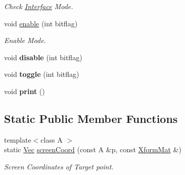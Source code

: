 \begin{DoxyCompactItemize}
\begin{DoxyCompactList}\small\item\em Check \hyperlink{classvsr_1_1_interface}{Interface} Mode. \end{DoxyCompactList}\item 
\hypertarget{classvsr_1_1_interface_a73d0fa0608b54b649203fd647e4398cd}{void \hyperlink{classvsr_1_1_interface_a73d0fa0608b54b649203fd647e4398cd}{enable} (int bitflag)}\label{classvsr_1_1_interface_a73d0fa0608b54b649203fd647e4398cd}

\begin{DoxyCompactList}\small\item\em Enable Mode. \end{DoxyCompactList}\item 
\hypertarget{classvsr_1_1_interface_a38ccaf32e5e57c426e7e76018c4b08f6}{void {\bfseries disable} (int bitflag)}\label{classvsr_1_1_interface_a38ccaf32e5e57c426e7e76018c4b08f6}

\item 
\hypertarget{classvsr_1_1_interface_ae85f530e7401cedbb90b2880f107bbc8}{void {\bfseries toggle} (int bitflag)}\label{classvsr_1_1_interface_ae85f530e7401cedbb90b2880f107bbc8}

\item 
\hypertarget{classvsr_1_1_interface_a9cda0861c810551a99c1e1080d834deb}{void {\bfseries print} ()}\label{classvsr_1_1_interface_a9cda0861c810551a99c1e1080d834deb}

\end{DoxyCompactItemize}
\subsection*{Static Public Member Functions}
\begin{DoxyCompactItemize}
\item 
\hypertarget{classvsr_1_1_interface_a85474f7837ab3a5483f824af1bf18bb1}{{\footnotesize template$<$class A $>$ }\\static \hyperlink{namespacevsr_a0d061c30ac198a710a1b92dd8b343273}{Vec} \hyperlink{classvsr_1_1_interface_a85474f7837ab3a5483f824af1bf18bb1}{screen\-Coord} (const A \&p, const \hyperlink{structvsr_1_1_xform_mat}{Xform\-Mat} \&)}\label{classvsr_1_1_interface_a85474f7837ab3a5483f824af1bf18bb1}

\begin{DoxyCompactList}\small\item\em Screen Coordinates of Target point. \end{DoxyCompactList}\end{DoxyCompactItemize}
